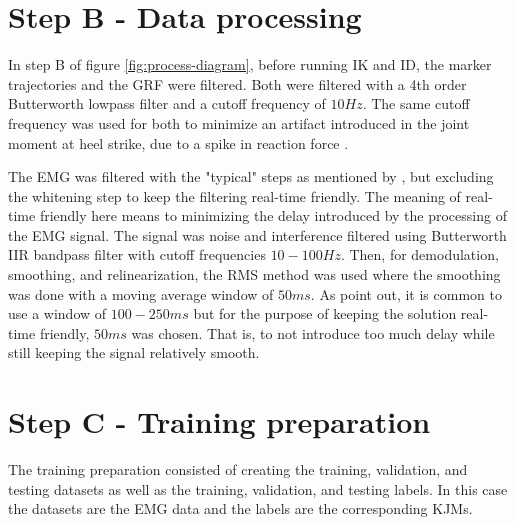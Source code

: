 \documentclass[../main.tex]{subfiles}
\begin{document}
\section{Step B - Data processing}
\label{sec:data-processing}
In step B of figure \ref{fig:process-diagram}, before running \ac{IK} and \ac{ID}, the marker trajectories and the \ac{GRF} were filtered.
Both were filtered with a 4th order Butterworth lowpass filter and a cutoff frequency of $10Hz$. 
The same cutoff frequency was used for both to minimize an artifact introduced in the joint moment at heel strike, due to a spike in reaction force \cite{Kristianslund2012}.

The \ac{EMG} was filtered with the "typical" steps as mentioned by \textcite[99]{Clancy2016}, but excluding the whitening step to keep the filtering real-time friendly.
The meaning of real-time friendly here means to minimizing the delay introduced by the processing of the \ac{EMG} signal.
The signal was noise and interference filtered using Butterworth IIR bandpass filter with cutoff frequencies $10-100Hz$. 
Then, for demodulation, smoothing, and relinearization, the RMS method was used where the smoothing was done with a moving average window of $50ms$. 
As \textcite{Clancy2016} point out, it is common to use a window of $100-250 ms$ but for the purpose of keeping the solution real-time friendly, $50ms$ was chosen.
That is, to not introduce too much delay while still keeping the signal relatively smooth.

\section{Step C - Training preparation}
The training preparation consisted of creating the training, validation, and testing datasets as well as the training, validation, and testing labels.
In this case the datasets are the \ac{EMG} data and the labels are the corresponding \acp{KJM}.
\end{document}
